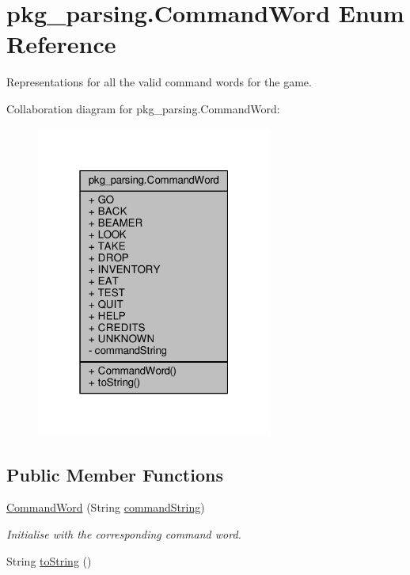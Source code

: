 \hypertarget{enumpkg__parsing_1_1CommandWord}{\section{pkg\-\_\-parsing.\-Command\-Word Enum Reference}
\label{enumpkg__parsing_1_1CommandWord}
}


Representations for all the valid command words for the game.  




Collaboration diagram for pkg\-\_\-parsing.\-Command\-Word\-:\nopagebreak
\begin{figure}[H]
\begin{center}
\leavevmode
\includegraphics[width=220pt]{enumpkg__parsing_1_1CommandWord__coll__graph}
\end{center}
\end{figure}
\subsection*{Public Member Functions}
\begin{DoxyCompactItemize}
\item 
\hyperlink{enumpkg__parsing_1_1CommandWord_a7ff71159ae2c26835f5336580152d088}{Command\-Word} (String \hyperlink{enumpkg__parsing_1_1CommandWord_a2def2bcb3d7c2e973ad357341f4bd5b3}{command\-String})
\begin{DoxyCompactList}\small\item\em Initialise with the corresponding command word. \end{DoxyCompactList}\item 
String \hyperlink{enumpkg__parsing_1_1CommandWord_ab6d70b61b7418ce7dfa930bda64132c5}{to\-String} ()
\end{DoxyCompactItemize}

